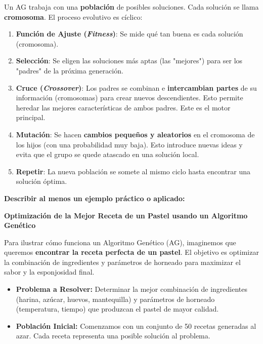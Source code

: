 \documentclass[letterpaper,12pt]{article}
\begin{document}
\begin{itemize}
        \vspace{0.2 cm}
        Un AG trabaja con una \textbf{población} de posibles soluciones. Cada solución se llama \textbf{cromosoma}.
        El proceso evolutivo es cíclico:
        \begin{enumerate}
         \item \textbf{Función de Ajuste (\textit{Fitness})}: Se mide qué tan buena es cada solución (cromosoma).
         \item \textbf{Selección}: Se eligen las soluciones más aptas (las "mejores") para ser los "padres" de la próxima generación.
         \item \textbf{Cruce (\textit{Crossover})}: Los padres se combinan e \textbf{intercambian partes} de su información (cromosomas) para crear nuevos descendientes. Esto permite heredar las mejores características de ambos padres. Este es el motor principal.
         \item \textbf{Mutación}: Se hacen \textbf{cambios pequeños y aleatorios} en el cromosoma de los hijos (con una probabilidad muy baja). Esto introduce nuevas ideas y evita que el grupo se quede atascado en una solución local.
         \item \textbf{Repetir}: La nueva población se somete al mismo ciclo hasta encontrar una solución óptima.
        \end{enumerate}

        \textbf{Describir al menos un ejemplo práctico o aplicado:}

        \vspace{0.2 cm}
        \textbf{Optimización de la Mejor Receta de un Pastel usando un Algoritmo Genético}

    \vspace{0.2 cm}
    Para ilustrar cómo funciona un Algoritmo Genético (AG), imaginemos que queremos
    \textbf{encontrar la receta perfecta de un pastel}.  
    El objetivo es optimizar la combinación de ingredientes y parámetros de horneado 
    para maximizar el sabor y la esponjosidad final.
    
    \begin{itemize}
        \item \textbf{Problema a Resolver:}  
        Determinar la mejor combinación de ingredientes (harina, azúcar, huevos, mantequilla) y
        parámetros de horneado (temperatura, tiempo) que produzcan el pastel de mayor calidad.
    
        \item \textbf{Población Inicial:}  
        Comenzamos con un conjunto de 50 recetas generadas al azar.  
        Cada receta representa una posible solución al problema.
    

\end{itemize}
\end{itemize}
\end{document}

